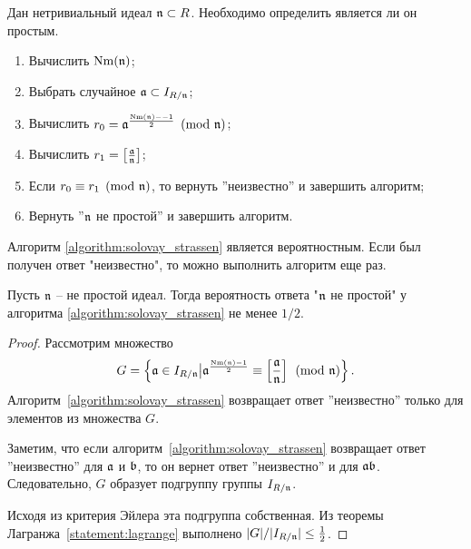 \documentclass[_00_dissertation.tex]{subfiles}
\begin{document}
\begin{algorithm}\label{algorithm:solovay_strassen}
    Дан нетривиальный идеал $\mathfrak{n} \subset R$.
    Необходимо определить является ли он простым.

    \begin{enumerate}
        \item Вычислить $\textrm{Nm}(\mathfrak{n})$;
        
        \item Выбрать случайное $\mathfrak{a} \subset I_{R/\mathfrak{n}}$;

        \item Вычислить $r_0 = \mathfrak{a}^{\frac{\textrm{Nm}(\mathfrak{n}) -- 1}{2}} \pmod{\mathfrak{n}}$;

        \item Вычислить $r_1 = \left[\frac{\mathfrak{a}}{\mathfrak{n}}\right]$;

        \item Если $r_0 \equiv r_1 \pmod{\mathfrak{n}}$, то вернуть ''неизвестно'' и завершить алгоритм;

        \item Вернуть ''$\mathfrak{n}$ не простой'' и завершить алгоритм.
    \end{enumerate}
\end{algorithm}

\begin{remark}
    Алгоритм \ref{algorithm:solovay_strassen} является вероятностным.
    Если был получен ответ "неизвестно", то можно выполнить алгоритм еще раз.
\end{remark}

\begin{proposition}
    Пусть $\mathfrak{n}$ -- не простой идеал.
    Тогда вероятность ответа "$\mathfrak{n}$ не простой" у алгоритма \ref{algorithm:solovay_strassen} не менее $1/2$.
\end{proposition}
\begin{proof}
    Рассмотрим множество
    \begin{equation*}
        G = \left\{
            \mathfrak{a} \in I_{R/\mathfrak{n}} \big| \mathfrak{a}^{\frac{\textrm{Nm}(\mathfrak{n}) - 1}{2}} \equiv \left[\frac{\mathfrak{a}}{\mathfrak{n}}\right] \pmod{\mathfrak{n}}
        \right\}.
    \end{equation*}
    Алгоритм~\ref{algorithm:solovay_strassen} возвращает ответ ''неизвестно'' только для элементов из множества $G$.

    Заметим, что если алгоритм~\ref{algorithm:solovay_strassen} возвращает ответ ''неизвестно'' для $\mathfrak{a}$ и $\mathfrak{b}$, то он вернет ответ ''неизвестно'' и для $\mathfrak{a}\mathfrak{b}$.
    Следовательно, $G$ образует подгруппу группы $I_{R/\mathfrak{n}}$.

    Исходя из критерия Эйлера эта подгруппа собственная.
    Из теоремы Лагранжа~\ref{statement:lagrange} выполнено $|G|/|I_{R/\mathfrak{n}}| \le \frac{1}{2}$.
\end{proof}
\end{document}
